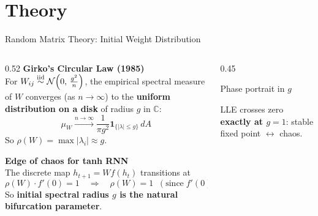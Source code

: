 \documentclass[11pt,aspectratio=169]{beamer}
\begin{document}
\section{Theory}

\begin{frame}{Random Matrix Theory: Initial Weight Distribution}

\begin{columns}[T]
\begin{column}{0.52\textwidth}
\textbf{Girko's Circular Law (1985)}\\
For $W_{ij} \overset{\rm iid}{\sim} \mathcal{N}\!\left(0,\,\tfrac{g^2}{n}\right)$,
the empirical spectral measure of $W$ converges (as $n\to\infty$) to
the \textbf{uniform distribution on a disk} of radius $g$ in $\mathbb{C}$:
\[
\mu_W \xrightarrow{n\to\infty}
  \frac{1}{\pi g^2}\mathbf{1}_{\{|\lambda| \le g\}}\,dA
\]
So $\rho(W) = \max|\lambda_i| \approx g$.

\vspace{0.4em}
\textbf{Edge of chaos for tanh RNN}\\
The discrete map $h_{t+1} = Wf(h_t)$ transitions at
\[
\rho(W)\cdot f'(0) = 1
\quad\Rightarrow\quad
\rho(W) = 1 \;\;(\text{since}\;f'(0)=1\;\text{for tanh})
\]
So \textbf{initial spectral radius $g$ is the natural bifurcation parameter}.
\end{column}
\begin{column}{0.45\textwidth}
\begin{block}{Phase portrait in $g$}
\begin{center}
\end{center}
LLE crosses zero \textbf{exactly at $g=1$}:
stable fixed point $\leftrightarrow$ chaos.
\end{block}
\end{column}
\end{columns}
\end{frame}
\end{document}
